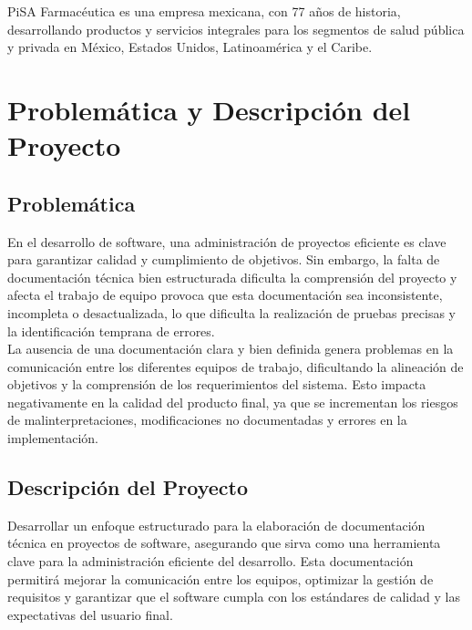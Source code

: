 \documentclass[12pt,letterpaper,spanish, xcolor=table]{report}
\begin{document}
PiSA Farmacéutica es una empresa mexicana, con 77 años de historia, desarrollando productos y servicios integrales para los segmentos de salud pública y privada en México, Estados Unidos, Latinoamérica y el Caribe.

\newpage
	
\chapter{Problemática y Descripción del Proyecto}
\newpage

\section{Problemática}

	En el desarrollo de software, una administración de proyectos eficiente es clave para garantizar calidad y cumplimiento de objetivos. Sin embargo, la falta de documentación técnica bien estructurada dificulta la comprensión del proyecto y afecta el trabajo de equipo provoca que esta documentación sea inconsistente, incompleta o desactualizada, lo que dificulta la realización de pruebas precisas y la identificación temprana de errores. \\
	
	La ausencia de una documentación clara y bien definida genera problemas en la comunicación entre los diferentes equipos de trabajo, dificultando la alineación de objetivos y la comprensión de los requerimientos del sistema. Esto impacta negativamente en la calidad del producto final, ya que se incrementan los riesgos de malinterpretaciones, modificaciones no documentadas y errores en la implementación.
	

\section{Descripción del Proyecto}
	
	Desarrollar un enfoque estructurado para la elaboración de documentación técnica en proyectos de software, asegurando que sirva como una herramienta clave para la administración eficiente del desarrollo. Esta documentación permitirá mejorar la comunicación entre los equipos, optimizar la gestión de requisitos y garantizar que el software cumpla con los estándares de calidad y las expectativas del usuario final.
\end{document}
